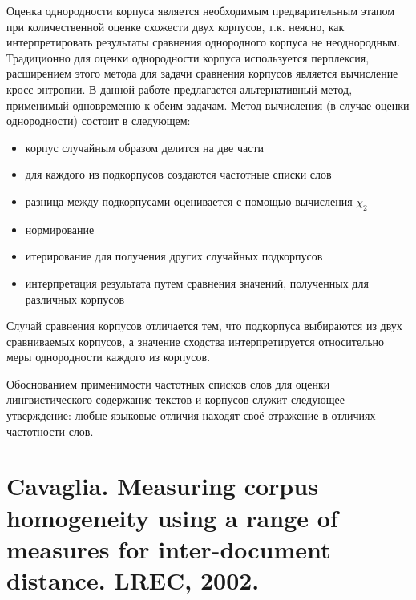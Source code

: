 Оценка однородности корпуса является необходимым предварительным этапом при количественной оценке схожести двух корпусов, т.к. неясно, как интерпретировать результаты сравнения однородного корпуса не неоднородным. Традиционно для оценки однородности корпуса используется перплексия, расширением этого метода для задачи сравнения корпусов является вычисление кросс-энтропии. В данной работе предлагается альтернативный метод, применимый одновременно к обеим задачам. Метод вычисления (в случае оценки однородности) состоит в следующем:
\begin{itemize}
    \item корпус случайным образом делится на две части
    \item для каждого из подкорпусов создаются частотные списки слов
    \item разница между подкорпусами оценивается с помощью вычисления $\chi_2$
    \item нормирование
    \item итерирование для получения других случайных подкорпусов
    \item интерпретация результата путем сравнения значений, полученных для различных корпусов
\end{itemize}
Случай сравнения корпусов отличается тем, что подкорпуса выбираются из двух сравниваемых корпусов, а значение сходства интерпретируется относительно меры однородности каждого из корпусов.

Обоснованием применимости частотных списков слов для оценки лингвистического содержание текстов и корпусов служит следующее утверждение: любые языковые отличия находят своё отражение в отличиях частотности слов. 




\section{Cavaglia. Measuring corpus homogeneity using a range of measures for inter-document distance. LREC, 2002.}

